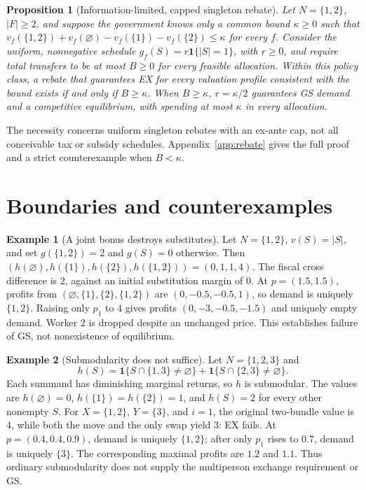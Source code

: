 \documentclass[11pt]{article}
\newtheorem{proposition}{Proposition}
\theoremstyle{definition}
\newtheorem{example}{Example}
\theoremstyle{remark}
\numberwithin{equation}{section}
\begin{document}
\begin{proposition}[Information-limited, capped singleton rebate]\label{prop:rebate}
Let $N=\{1,2\}$, $|F|\ge2$, and suppose the government knows only a common bound $\kappa\ge0$ such that $v_f(\{1,2\})+v_f(\varnothing)-v_f(\{1\})-v_f(\{2\})\le\kappa$ for every $f$. Consider the uniform, nonnegative schedule $g_f(S)=r\mathbf1\{|S|=1\}$, with $r\ge0$, and require total transfers to be at most $B\ge0$ for \emph{every} feasible allocation. Within this policy class, a rebate that guarantees EX for every valuation profile consistent with the bound exists if and only if $B\ge\kappa$. When $B\ge\kappa$, $r=\kappa/2$ guarantees GS demand and a competitive equilibrium, with spending at most $\kappa$ in every allocation.
\end{proposition}
\noindent The necessity concerns uniform singleton rebates with an ex-ante cap, not all conceivable tax or subsidy schedules. Appendix~\ref{app:rebate} gives the full proof and a strict counterexample when $B<\kappa$.

\section{Boundaries and counterexamples}
\begin{example}[A joint bonus destroys substitutes]\label{ex:bonus}
Let $N=\{1,2\}$, $v(S)=|S|$, and set $g(\{1,2\})=2$ and $g(S)=0$ otherwise. Then $(h(\varnothing),h(\{1\}),h(\{2\}),h(\{1,2\}))=(0,1,1,4)$. The fiscal cross difference is $2$, against an initial substitution margin of $0$. At $p=(1.5,1.5)$, profits from $(\varnothing,\{1\},\{2\},\{1,2\})$ are $(0,-0.5,-0.5,1)$, so demand is uniquely $\{1,2\}$. Raising only $p_1$ to $4$ gives profits $(0,-3,-0.5,-1.5)$ and uniquely empty demand. Worker 2 is dropped despite an unchanged price. This establishes failure of GS, not nonexistence of equilibrium.
\end{example}

\begin{example}[Submodularity does not suffice]\label{ex:coverage}
Let $N=\{1,2,3\}$ and
\[
h(S)=\mathbf 1\{S\cap\{1,3\}\ne\varnothing\}
     +\mathbf 1\{S\cap\{2,3\}\ne\varnothing\}.
\]
Each summand has diminishing marginal returns, so $h$ is submodular. The values are $h(\varnothing)=0$, $h(\{1\})=h(\{2\})=1$, and $h(S)=2$ for every other nonempty $S$. For $X=\{1,2\}$, $Y=\{3\}$, and $i=1$, the original two-bundle value is $4$, while both the move and the only swap yield $3$: EX fails. At $p=(0.4,0.4,0.9)$, demand is uniquely $\{1,2\}$; after only $p_1$ rises to $0.7$, demand is uniquely $\{3\}$. The corresponding maximal profits are $1.2$ and $1.1$. Thus ordinary submodularity does not supply the multiperson exchange requirement or GS.
\end{example}
\end{document}
